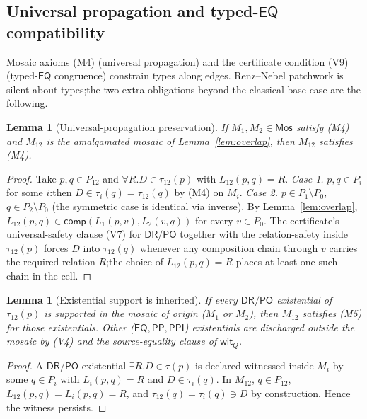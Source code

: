 \documentclass[11pt]{article}
\newtheorem{lemma}[theorem]{Lemma}
\newcommand{\EQ}{\mathsf{EQ}}
\newcommand{\DR}{\mathsf{DR}}
\newcommand{\PO}{\mathsf{PO}}
\newcommand{\PP}{\mathsf{PP}}
\newcommand{\PPI}{\mathsf{PPI}}
\newcommand{\comp}{\mathsf{comp}}
\newcommand{\Mos}{\mathsf{Mos}}
\begin{document}
\subsection{Universal propagation and typed-\texorpdfstring{$\EQ$}{EQ} compatibility}
\label{ssec:M4-preservation}

Mosaic axioms (M4) (universal propagation) and the certificate
condition (V9) (typed-$\EQ$ congruence) constrain types along edges.
Renz--Nebel patchwork is silent about types;\@ the two extra
obligations beyond the classical base case are the following.

\begin{lemma}[Universal-propagation preservation]\label{lem:M4-preserved}
If $M_1,M_2\in\Mos$ satisfy (M4) and $M_{12}$ is the amalgamated
mosaic of Lemma~\ref{lem:overlap}, then $M_{12}$ satisfies (M4).
\end{lemma}

\begin{proof}
Take $p,q\in P_{12}$ and $\forall R.D\in\tau_{12}(p)$ with
$L_{12}(p,q)=R$.
\emph{Case 1.}  $p,q\in P_i$ for some $i$:\@ then
$D\in\tau_i(q)=\tau_{12}(q)$ by (M4) on $M_i$.
\emph{Case 2.}  $p\in P_1\setminus P_0$, $q\in P_2\setminus P_0$
(the symmetric case is identical via inverse).  By
Lemma~\ref{lem:overlap}, $L_{12}(p,q)\in\comp(L_1(p,v),L_2(v,q))$
for every $v\in P_0$.  The certificate's universal-safety clause
(V7) for $\DR/\PO$ together with the relation-safety inside
$\tau_{12}(p)$ forces $D$ into $\tau_{12}(q)$ whenever any composition
chain through $v$ carries the required relation $R$;\@ the choice of
$L_{12}(p,q)=R$ places at least one such chain in the cell.
\end{proof}

\begin{lemma}[Existential support is inherited]\label{lem:M5-inherited}
If every $\DR/\PO$ existential of $\tau_{12}(p)$ is supported in
the mosaic of origin ($M_1$ or $M_2$), then $M_{12}$ satisfies (M5)
for those existentials.  Other ($\EQ,\PP,\PPI$) existentials are
discharged outside the mosaic by (V4) and the source-equality clause
of $\mathsf{wit}_Q$.
\end{lemma}

\begin{proof}
A $\DR/\PO$ existential $\exists R.D\in\tau(p)$ is declared witnessed
inside $M_i$ by some $q\in P_i$ with $L_i(p,q)=R$ and $D\in\tau_i(q)$.
In $M_{12}$, $q\in P_{12}$, $L_{12}(p,q)=L_i(p,q)=R$, and
$\tau_{12}(q)=\tau_i(q)\ni D$ by construction.  Hence the witness
persists.
\end{proof}
\end{document}
